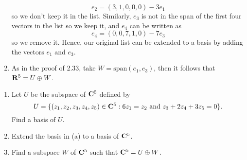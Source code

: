 \begin{solution}
\begin{enumerate}[label=(\alph*)]
        $$e_2 = (3,1, 0,0,0) - 3 e_1$$
        so we don't keep it in the list. Similarly, $e_3$ is not in the span of the first four vectors in the list so we keep it, and $e_4$ can be written as
        $$e_4 = (0,0,7,1,0) - 7e_3$$
        so we remove it. Hence, our original list can be extended to a basis by adding the vectors $e_1$ and $e_3$.
        \item As in the proof of 2.33, take $W = \text{span}(e_1, e_3)$, then it follows that $\mathbf{R}^5 = U \oplus W$.\\
    \end{enumerate}
\end{solution}

\begin{exercise}
    \vspace{-0.6cm}
    \begin{enumerate}[label=(\alph*)]
        \item Let $U$ be the subspace of $\mathbf{C}^5$ defined by
        $$U = \{(z_1, z_2, z_3, z_4, z_5) \in \mathbf{C}^5 : 6z_1 = z_2 \text{ and } z_3 + 2z_4 + 3z_5 = 0\}.$$
        Find a basis of $U$.
        \item Extend the basis in (a) to a basis of $\mathbf{C}^5$.
        \item Find a subspace $W$ of $\mathbf{C}^5$ such that $\mathbf{C}^5 = U \oplus W$. \\
    \end{enumerate}
\end{exercise}

